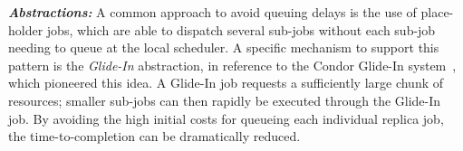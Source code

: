 \documentclass{rspublic}
\newcommand{\alnote}[1]{ {\textcolor{blue} { ***AL: #1 }}}
\newcommand{\jhanote}[1]{ {\textcolor{red} { ***SJ: #1 }}}
\newcommand{\alnote}[1]{}
\newcommand{\jhanote}[1]{}
\newcommand{\I}[1]{\textit{#1}}
\newcommand{\replicaagent}[1]{Replica-Agent }
\newcommand{\remanager}[1]{RE-Manager }
\begin{document}
{\noindent \it \bf Abstractions:} A common approach to
avoid queuing delays is the use of place-holder jobs, which are
able to dispatch several sub-jobs without each sub-job needing to
queue at the local scheduler. A specific mechanism to support this
pattern is the \emph{Glide-In} abstraction, in reference to the Condor
Glide-In system~\citep{citeulike:291860}, which pioneered this idea. A
Glide-In job requests a sufficiently large chunk of resources; smaller
sub-jobs can then rapidly be executed through the Glide-In job.  By
avoiding the high initial costs for queueing each individual replica
job, the time-to-completion can be dramatically reduced.


% 
                      
\end{document}
